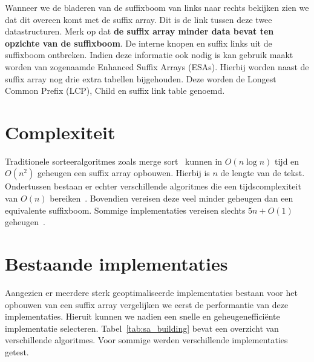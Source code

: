 Wanneer we de bladeren van de suffixboom van links naar rechts bekijken zien we dat dit overeen komt met de suffix array.
Dit is de link tussen deze twee datastructuren.
Merk op dat \textbf{de suffix array minder data bevat ten opzichte van de suffixboom}.
De interne knopen en suffix links uit de suffixboom ontbreken.
Indien deze informatie ook nodig is kan gebruik maakt worden van zogenaamde Enhanced Suffix Arrays (ESAs).
Hierbij worden naast de suffix array nog drie extra tabellen bijgehouden.
Deze worden de Longest Common Prefix (LCP), Child en suffix link table genoemd.

\section{Complexiteit}\label{sec:complexiteit}
Traditionele sorteeralgoritmes zoals merge sort~\cite{mergeSort} kunnen in $O(n \log n)$ tijd en $O(n^2)$ geheugen een suffix array opbouwen.
Hierbij is $n$ de lengte van de tekst.
Ondertussen bestaan er echter verschillende algoritmes die een tijdscomplexiteit van $O(n)$ bereiken~\cite{sais, ko_alura, radixSA, dark_archon, libdivsufsort}.
Bovendien vereisen deze veel minder geheugen dan een equivalente suffixboom.
Sommige implementaties vereisen slechts $5n + O(1)$ geheugen~\cite{dark_archon, libdivsufsort}.


\section{Bestaande implementaties}\label{sec:bestaande-implementaties}
Aangezien er meerdere sterk geoptimaliseerde implementaties bestaan voor het opbouwen van een suffix array vergelijken we eerst de performantie van deze implementaties.
Hieruit kunnen we nadien een snelle en geheugenefficiënte implementatie selecteren.
Tabel~\ref{tab:sa_building} bevat een overzicht van verschillende algoritmes.
Voor sommige werden verschillende implementaties getest.

